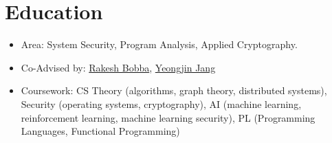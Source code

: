 \section{Education}
{
    \begin{itemize}
        \item Area: System Security, Program Analysis, Applied Cryptography.
        \item Co-Advised by:
              \href{https://eecs.oregonstate.edu/people/bobba-rakesh}{Rakesh
                  Bobba},
              \href{https://www.unexploitable.systems/}{Yeongjin Jang}
        \item Coursework: CS Theory (algorithms, graph theory, distributed
              systems), Security (operating systems, cryptography), AI (machine
              learning, reinforcement learning, machine learning security), PL
              (Programming Languages, Functional Programming)
    \end{itemize}
}

